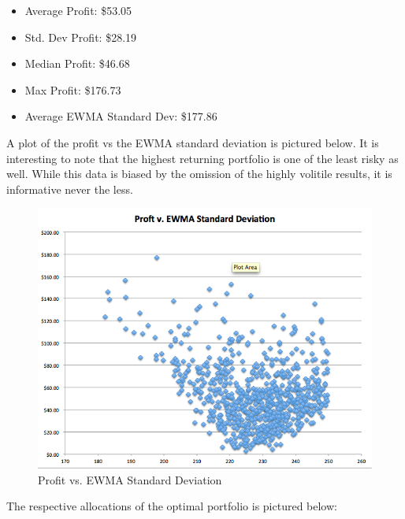 \documentclass[12pt]{article}
\begin{document}
\begin{itemize}
	\item Average Profit: \$53.05
	\item Std. Dev Profit: \$28.19 
	\item Median Profit: \$46.68
	\item Max Profit: \$176.73 
	\item Average EWMA Standard Dev: \$177.86
\end{itemize}

A plot of the profit vs the EWMA standard deviation is pictured below. It is interesting to note that the highest returning portfolio is one of the least risky as well. While this data is biased by the omission of the highly volitile results, it is informative never the less. 


\begin{figure}[!h]
\begin{center}
\includegraphics[scale=.5]{Figures/ProfitvVar.png}
\caption{Profit vs. EWMA Standard Deviation}
\end{center}
\end{figure}
\newpage

The respective allocations of the optimal portfolio is pictured below: 
\end{document}
